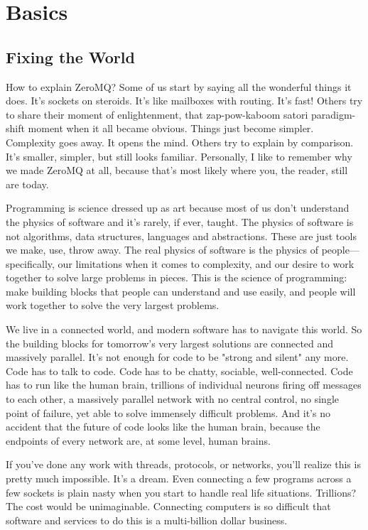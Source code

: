 
\section{Basics}

\subsection{Fixing the World}

How to explain ZeroMQ? Some of us start by saying all the wonderful things it
does. It's sockets on steroids. It's like mailboxes with routing. It's fast!
Others try to share their moment of enlightenment, that zap-pow-kaboom satori
paradigm-shift moment when it all became obvious. Things just become simpler.
Complexity goes away. It opens the mind. Others try to explain by comparison.
It's smaller, simpler, but still looks familiar. Personally, I like to remember
why we made ZeroMQ at all, because that's most likely where you, the reader,
still are today.

Programming is science dressed up as art because most of us don't understand
the physics of software and it's rarely, if ever, taught. The physics of
software is not algorithms, data structures, languages and abstractions. These
are just tools we make, use, throw away. The real physics of software is the
physics of people—specifically, our limitations when it comes to complexity,
and our desire to work together to solve large problems in pieces. This is the
science of programming: make building blocks that people can understand and use
easily, and people will work together to solve the very largest problems.

We live in a connected world, and modern software has to navigate this world.
So the building blocks for tomorrow's very largest solutions are connected and
massively parallel. It's not enough for code to be "strong and silent" any
more. Code has to talk to code. Code has to be chatty, sociable,
well-connected. Code has to run like the human brain, trillions of individual
neurons firing off messages to each other, a massively parallel network with no
central control, no single point of failure, yet able to solve immensely
difficult problems. And it's no accident that the future of code looks like the
human brain, because the endpoints of every network are, at some level, human
brains.

If you've done any work with threads, protocols, or networks, you'll realize
this is pretty much impossible. It's a dream. Even connecting a few programs
across a few sockets is plain nasty when you start to handle real life
situations. Trillions? The cost would be unimaginable. Connecting computers is
so difficult that software and services to do this is a multi-billion dollar
business.

